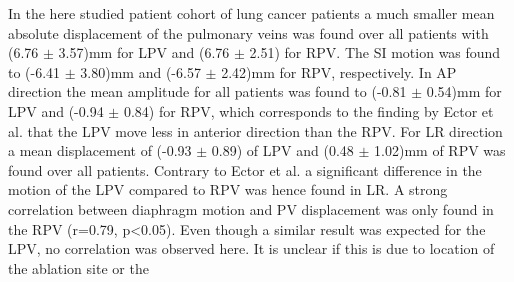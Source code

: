 \documentclass[type=dr, dr=rernat, accentcolor=tud7b,colorbacktitle, bigchapter, openright, twoside, 12pt ]{tudthesis}
\begin{document}
In the here studied patient cohort of lung cancer patients a much smaller mean absolute displacement of the pulmonary veins was found over all patients with 
(6.76 $\pm$ 3.57)mm for LPV and (6.76 $\pm$ 2.51) for RPV. The SI motion was found to (-6.41 $\pm$ 3.80)mm and (-6.57 $\pm$ 2.42)mm for RPV, 
respectively. In AP direction the mean amplitude for all patients was found to (-0.81 $\pm$ 0.54)mm for LPV and (-0.94 $\pm$ 0.84) for RPV, 
which corresponds to the finding by Ector et al. that the LPV move less in anterior direction than the RPV. For LR direction 
a mean displacement of (-0.93 $\pm$ 0.89) of LPV and (0.48 $\pm$ 1.02)mm of RPV was found over all patients. 
Contrary to Ector et al. a significant difference in the motion of the LPV compared to RPV was hence found in LR. 
A strong correlation between diaphragm motion and PV displacement was only found in the RPV (r=0.79, p<0.05). Even though a similar result 
was expected for the LPV, no correlation was observed here. It is unclear if this is due to location of the ablation site or the 
\end{document}
